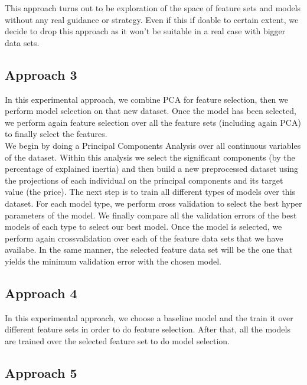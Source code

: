 This approach turns out to be exploration of the space of feature sets and models without any real guidance or strategy. Even if this if doable to certain extent, we decide to drop this approach as it won't be suitable in a real case with bigger data sets.




\subsection{Approach 3}
In this experimental approach, we combine PCA for feature selection, then we perform model selection on that new dataset. Once the model has been selected, we perform again feature selection over all the feature sets (including again PCA)
 to finally select the features.\\ 
We begin by doing a Principal Components Analysis over all continuous variables of the dataset. Within this analysis we select the significant components (by the percentage of explained inertia) and then build a new preprocessed dataset using the projections of each individual on the principal components and its target value (the price). The next step is to train all different types of models over this dataset. For each model type, we perform cross validation to select the best hyper parameters of the model. We finally compare all the validation errors of the best models of each type to select our best model. Once the model is selected, we perform again crossvalidation over each of the feature data sets that we have availabe. In the same manner, the selected feature data set will be the one that yields the minimum validation error with the chosen model.



\subsection{Approach 4}

In this experimental approach, we choose a baseline model and the train it over different feature sets in order to do feature selection. After that, all the models are trained over the selected feature set to do model selection.\\




\subsection{Approach 5}

